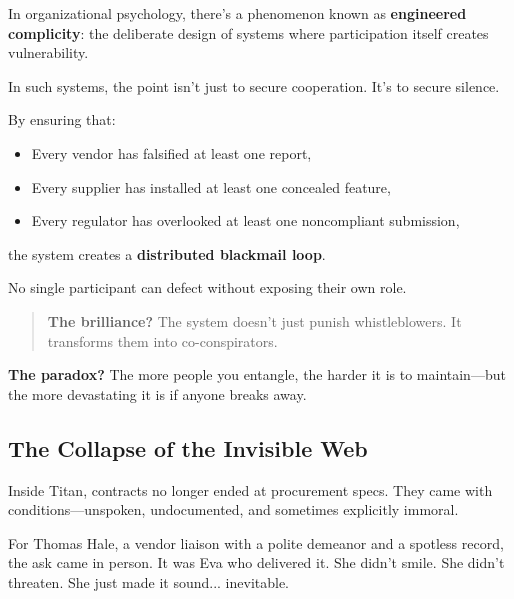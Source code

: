 \begin{tcolorbox}[colback=blue!5!white, colframe=blue!50!black, breakable,
title={Psychological Sidebar: Engineered Complicity — When Risk Is a Prerequisite}]

In organizational psychology, there’s a phenomenon known as \textbf{engineered complicity}:
the deliberate design of systems where participation itself creates vulnerability.

\medskip

In such systems, the point isn’t just to secure cooperation.
It’s to secure silence.

\medskip

By ensuring that:
\begin{itemize}
\item Every vendor has falsified at least one report,
\item Every supplier has installed at least one concealed feature,
\item Every regulator has overlooked at least one noncompliant submission,
\end{itemize}
the system creates a \textbf{distributed blackmail loop}.

\medskip

No single participant can defect without exposing their own role.

\begin{quote}
\textbf{The brilliance?}
The system doesn’t just punish whistleblowers.
It transforms them into co-conspirators.
\end{quote}

\medskip

\textbf{The paradox?}
The more people you entangle,
the harder it is to maintain—but the more devastating it is if anyone breaks away.

\end{tcolorbox}




\subsection{The Collapse of the Invisible Web}

Inside Titan, contracts no longer ended at procurement specs.
They came with conditions—unspoken, undocumented, and sometimes explicitly immoral.

For Thomas Hale, a vendor liaison with a polite demeanor and a spotless record, the ask came in person.
It was Eva who delivered it.
She didn’t smile. She didn’t threaten. She just made it sound... inevitable.

